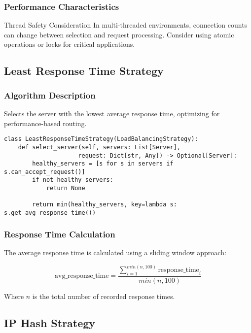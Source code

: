 \documentclass[12pt,a4paper]{article}
\begin{document}
\subsubsection{Performance Characteristics}
\begin{warningbox}{Thread Safety Consideration}
In multi-threaded environments, connection counts can change between selection and request processing. Consider using atomic operations or locks for critical applications.
\end{warningbox}

\subsection{Least Response Time Strategy}
\label{subsec:leastresponse}

\subsubsection{Algorithm Description}
Selects the server with the lowest average response time, optimizing for performance-based routing.

\begin{lstlisting}[caption=Least Response Time Strategy]
class LeastResponseTimeStrategy(LoadBalancingStrategy):
    def select_server(self, servers: List[Server], 
                     request: Dict[str, Any]) -> Optional[Server]:
        healthy_servers = [s for s in servers if s.can_accept_request()]
        if not healthy_servers:
            return None
        
        return min(healthy_servers, key=lambda s: s.get_avg_response_time())
\end{lstlisting}

\subsubsection{Response Time Calculation}
The average response time is calculated using a sliding window approach:

$$\text{avg\_response\_time} = \frac{\sum_{i=1}^{min(n, 100)} \text{response\_time}_i}{min(n, 100)}$$

Where $n$ is the total number of recorded response times.

\subsection{IP Hash Strategy}
\label{subsec:iphash}
\end{document}
